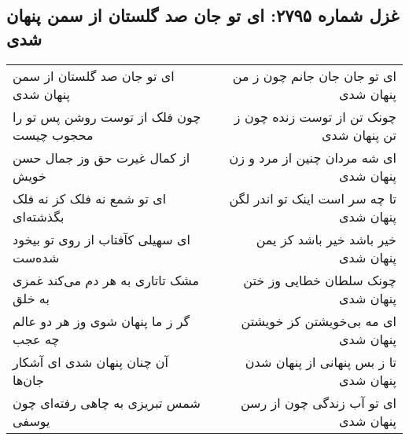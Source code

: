 \begin{center}
\section*{غزل شماره ۲۷۹۵: ای تو جان صد گلستان از سمن پنهان شدی}
\label{sec:2795}
\begin{longtable}{l p{0.5cm} r}
ای تو جان صد گلستان از سمن پنهان شدی
&&
ای تو جان جان جانم چون ز من پنهان شدی
\\
چون فلک از توست روشن پس تو را محجوب چیست
&&
چونک تن از توست زنده چون ز تن پنهان شدی
\\
از کمال غیرت حق وز جمال حسن خویش
&&
ای شه مردان چنین از مرد و زن پنهان شدی
\\
ای تو شمع نه فلک کز نه فلک بگذشته‌ای
&&
تا چه سر است اینک تو اندر لگن پنهان شدی
\\
ای سهیلی کآفتاب از روی تو بیخود شده‌ست
&&
خیر باشد خیر باشد کز یمن پنهان شدی
\\
مشک تاتاری به هر دم می‌کند غمزی به خلق
&&
چونک سلطان خطایی وز ختن پنهان شدی
\\
گر ز ما پنهان شوی وز هر دو عالم چه عجب
&&
ای مه بی‌خویشتن کز خویشتن پنهان شدی
\\
آن چنان پنهان شدی ای آشکار جان‌ها
&&
تا ز بس پنهانی از پنهان شدن پنهان شدی
\\
شمس تبریزی به چاهی رفته‌ای چون یوسفی
&&
ای تو آب زندگی چون از رسن پنهان شدی
\\
\end{longtable}
\end{center}
